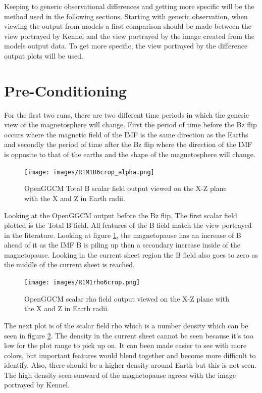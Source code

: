Keeping to generic observational differences and getting more specific will be
the method used in the following sections. Starting with generic observation,
when viewing the output from models a first comparison should be made between
the view portrayed by Kennel and the view portrayed by the image created from
the models output data. To get more specific, the view portrayed by the
difference output plots will be used.
\section{Pre-Conditioning}
For the first two runs, there are two different time periods in which the
generic view of the magnetosphere will change. First the period of time before
the Bz flip occurs where the magnetic field of the IMF is the same direction as
the Earths and secondly the period of time after the Bz flip where the direction
of the IMF is opposite to that of the earths and the shape of the magnetosphere
will change.
\begin{figure}
	\centering
	\texttt{[image: images/R1M1B6crop\_alpha.png]}
	\caption{OpenGGCM Total B scalar field output viewed on the X-Z plane with the
	X and Z in Earth radii. }
    \label{fig:R1M1B6crop}
	\figSpace
\end{figure}
Looking at the OpenGGCM output before the Bz flip, The first scalar field
plotted is the Total B field. All features of the B field match the view portrayed in the
literature. Looking at figure \ref{fig:R1M1B6crop}, the magnetopause has an
increase of B ahead of it as the IMF B is piling up then a secondary increase inside of
the magnetopause. Looking in the current sheet region the B field also goes to
zero as the middle of the current sheet is reached.
\begin{figure}
	\centering
	\texttt{[image: images/R1M1rho6crop.png]}
	\caption{OpenGGCM scalar rho field output viewed on the X-Z plane with the
	X and Z in Earth radii. }
    \label{fig:R1M1rho6crop}
	\figSpace
\end{figure}
The next plot is of the scalar field rho which is a number density which can
be seen in figure \ref{fig:R1M1rho6crop}. The density in the current
sheet cannot be seen because it's too low for the plot range to pick up on. It
can been made easier to see with more colors, but important features would blend
together and become more difficult to identify. Also, there should be a higher density 
around Earth but this is not seen. The high density seen sunward of the
magnetopause agrees with the image portrayed by Kennel.
